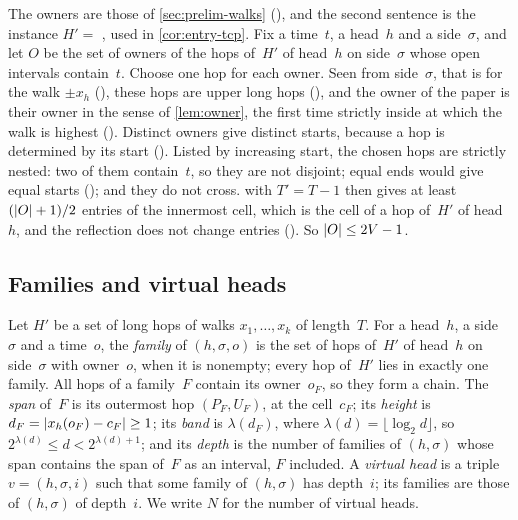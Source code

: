 \begin{outline}
The owners are those of \cref{sec:prelim-walks} (), and the second sentence is the instance $H'=$
, used in \cref{cor:entry-tcp}. Fix a time~$t$, a head~$h$ and a side~$\sigma$, and let $O$ be the set of
owners of the hops of~$H'$ of head~$h$ on side~$\sigma$ whose open intervals contain~$t$. Choose one hop for each owner.
Seen from side~$\sigma$, that is for the walk $\pm x_h$ (), these hops are upper long hops
(), and the owner of the paper is their owner in the sense of \cref{lem:owner}, the first time
strictly inside at which the walk is highest (). Distinct owners give distinct starts, because a
hop is determined by its start (). Listed by increasing start, the chosen hops are strictly nested:
two of them contain~$t$, so they are not disjoint; equal ends would give equal starts (); and they
do not cross.  with $T'=T-1$ then gives at least $(\lvert O \rvert+1)/2$ entries of the innermost cell, which is the
cell of a hop of~$H'$ of head~$h$, and the reflection does not change entries (). So $\lvert O \rvert\le2V-1$.
\end{outline}

\subsection{Families and virtual heads}\label{sec:nest-families}

\begin{definition}[Families]\label{def:families}
Let $H'$ be a set of long hops of walks $x_1,\dots,x_k$ of length~$T$. For a head~$h$, a side~$\sigma$ and a time~$o$,
the \emph{family} of $(h,\sigma,o)$ is the set of hops of~$H'$ of head~$h$ on side~$\sigma$ with owner~$o$, when it is
nonempty; every hop of~$H'$ lies in exactly one family. All hops of a family~$F$ contain its owner~$o_F$, so they form a
chain. The \emph{span} of~$F$ is its outermost hop $(P_F,U_F)$, at the cell~$c_F$; its \emph{height} is
$d_F=\lvert x_h(o_F)-c_F \rvert\ge1$; its \emph{band} is $\lambda(d_F)$, where $\lambda(d)=\lfloor\log_2d\rfloor$, so
$2^{\lambda(d)}\le d<2^{\lambda(d)+1}$; and its \emph{depth} is the number of families of $(h,\sigma)$ whose span
contains the span of~$F$ as an interval, $F$ included. A \emph{virtual head} is a triple $v=(h,\sigma,i)$ such that some
family of $(h,\sigma)$ has depth~$i$; its families are those of $(h,\sigma)$ of depth~$i$. We write $N$ for the number of
virtual heads.
\end{definition}

